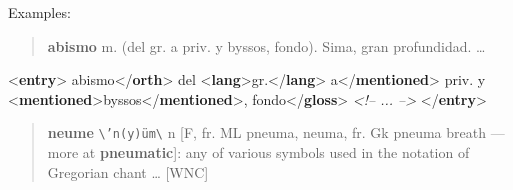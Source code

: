 Examples:
\begin{quote}{\bfseries abismo} m. (del gr. a priv. y byssos, fondo). Sima, gran profundidad. …\end{quote}
 \par\bgroup{}\exampleFont \begin{shaded}\noindent\mbox{}{<\textbf{entry}>}\mbox{}\newline 
{}\mbox{}\newline 
\hspace*{1em}abismo{</\textbf{orth}>}\mbox{}\newline 
{}\mbox{}\newline 
{}del {<\textbf{lang}>}gr.{</\textbf{lang}>}\mbox{}\newline 
\hspace*{1em}a{</\textbf{mentioned}>} priv. y {<\textbf{mentioned}>}byssos{</\textbf{mentioned}>},\mbox{}\newline 
{}fondo{</\textbf{gloss}>}\mbox{}\newline 
{}\mbox{}\newline 
\textit{<!-- ... -->}\mbox{}\newline 
{</\textbf{entry}>}\end{shaded}\egroup\par \noindent  
\begin{quote}{\bfseries neume} \texttt{\textbackslash 'n(y)üm\textbackslash } n [F, fr. ML pneuma, neuma, fr. Gk pneuma breath — more at {\bfseries pneumatic}]: any of various symbols used in the notation of Gregorian chant … [WNC]\end{quote}

